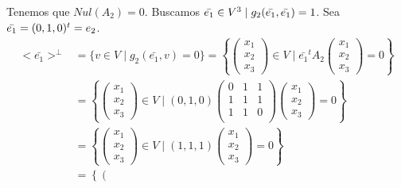 \begin{ejercicio}
\begin{enumerate}
\begin{enumerate}
            Tenemos que $Nul(A_2)=0$. Buscamos $\Bar{e_1}\in V^3 \mid g_2(\Bar{e_1},\Bar{e_1})=1$. Sea $\Bar{e_1}=(0,1,0)^t=e_2$.
            \begin{equation*}\begin{split}
                <\bar{e_1}>^\perp &= \{v \in V \mid g_2(\bar{e_1},v) = 0\} 
                = \left\{ \left(\begin{array}{c}
                     x_1 \\ x_2 \\ x_3
                \end{array} \right) \in V \mid \bar{e_1}^t A_2
                \left(\begin{array}{c}
                     x_1 \\ x_2 \\ x_3
                \end{array} \right) = 0\right\} \\
                &= \left\{ \left(\begin{array}{c}
                     x_1 \\ x_2 \\ x_3
                \end{array} \right) \in V \mid (0,1,0)\left(\begin{array}{ccc}
                    0 & 1 & 1 \\
                    1 & 1 & 1 \\
                    1 & 1 & 0 \\
                \end{array} \right) 
                \left(\begin{array}{c}
                     x_1 \\ x_2 \\ x_3
                \end{array} \right) = 0\right\} \\
                &= \left\{ \left(\begin{array}{c}
                     x_1 \\ x_2 \\ x_3
                \end{array} \right) \in V \mid (1,1,1)
                \left(\begin{array}{c}
                     x_1 \\ x_2 \\ x_3
                \end{array} \right) = 0\right\} \\
                &= \left\{ \left(\begin{array}{c}

\end{array}
\end{split}
\end{equation*}
\end{enumerate}
\end{enumerate}
\end{ejercicio}
